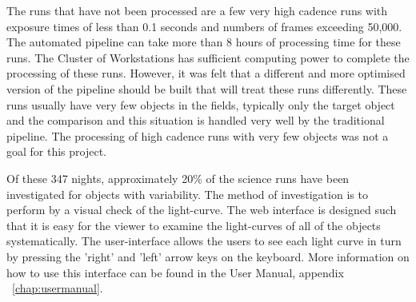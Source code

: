 The runs that have not been processed are a few very high cadence runs with exposure times of less than 0.1 seconds and numbers of frames exceeding 50,000. The automated pipeline can take more than 8 hours of processing time for these runs. The Cluster of Workstations has sufficient computing power to complete the processing of these runs. However, it was felt that a different  and more optimised version of the pipeline should be built that will treat these runs differently. These runs usually have very few objects in the fields, typically only the target object and the comparison and this situation is handled very well by the traditional pipeline. The processing of high cadence runs with very few objects was not a goal for this project. 

Of these 347 nights, approximately 20\% of the science runs have been investigated for objects with variability. The method of investigation is to perform by a visual check of the light-curve. The web interface is designed such that it is easy for the viewer to examine the light-curves of all of the objects systematically. The user-interface allows the users to see each light curve in turn by pressing the 'right' and 'left'  arrow keys on the keyboard. More information on how to use this interface can be found in the User Manual, appendix ~\ref{chap:usermanual}. 


